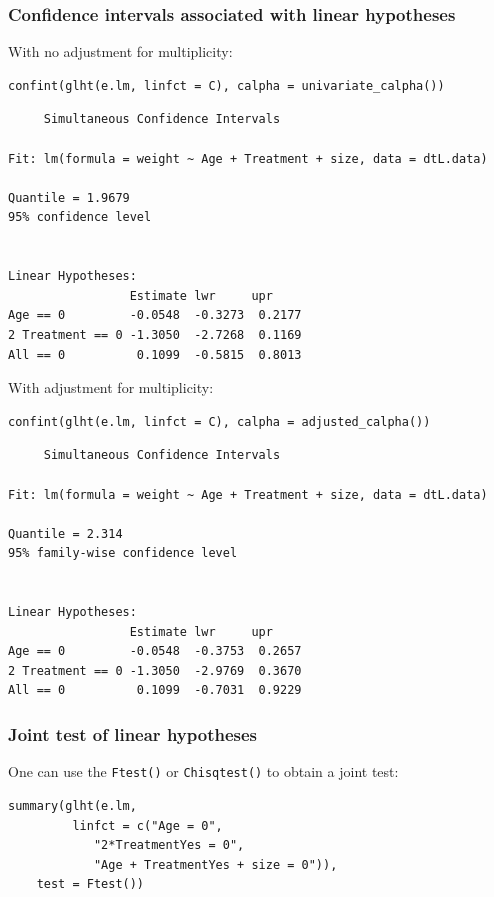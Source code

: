 \documentclass{article}
\begin{document}
\subsubsection{Confidence intervals associated with linear hypotheses}
\label{sec:orgb88bf24}

With no adjustment for multiplicity:
\lstset{language=r,label= ,caption= ,captionpos=b,numbers=none}
\begin{lstlisting}
confint(glht(e.lm, linfct = C), calpha = univariate_calpha())
\end{lstlisting}

\begin{verbatim}
	 Simultaneous Confidence Intervals

Fit: lm(formula = weight ~ Age + Treatment + size, data = dtL.data)

Quantile = 1.9679
95% confidence level
 

Linear Hypotheses:
                 Estimate lwr     upr    
Age == 0         -0.0548  -0.3273  0.2177
2 Treatment == 0 -1.3050  -2.7268  0.1169
All == 0          0.1099  -0.5815  0.8013
\end{verbatim}

With adjustment for multiplicity:
\lstset{language=r,label= ,caption= ,captionpos=b,numbers=none}
\begin{lstlisting}
confint(glht(e.lm, linfct = C), calpha = adjusted_calpha())
\end{lstlisting}

\begin{verbatim}
	 Simultaneous Confidence Intervals

Fit: lm(formula = weight ~ Age + Treatment + size, data = dtL.data)

Quantile = 2.314
95% family-wise confidence level
 

Linear Hypotheses:
                 Estimate lwr     upr    
Age == 0         -0.0548  -0.3753  0.2657
2 Treatment == 0 -1.3050  -2.9769  0.3670
All == 0          0.1099  -0.7031  0.9229
\end{verbatim}

\subsubsection{Joint test of linear hypotheses}
\label{sec:org50a8470}

One can use the \texttt{Ftest()} or \texttt{Chisqtest()} to obtain a joint test:
\lstset{language=r,label= ,caption= ,captionpos=b,numbers=none}
\begin{lstlisting}
summary(glht(e.lm, 
	     linfct = c("Age = 0",
			"2*TreatmentYes = 0",
			"Age + TreatmentYes + size = 0")), 
	test = Ftest())
\end{lstlisting}
\end{document}
